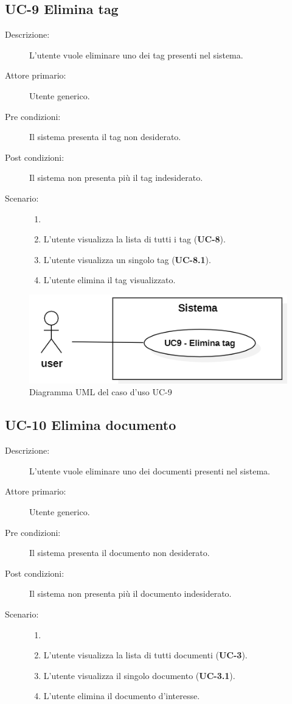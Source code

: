\subsection{UC-9 Elimina tag}
\begin{description}
    \item[Descrizione:] L'utente vuole eliminare uno dei tag presenti nel sistema.
    \item[Attore primario:] Utente generico.
    \item[Pre condizioni:] Il sistema presenta il tag non desiderato.
    \item[Post condizioni:] Il sistema non presenta più il tag indesiderato.
    \item[Scenario:]
    \begin{enumerate}
        \item[]
        \item L’utente visualizza la lista di tutti i tag (\textbf{UC-8}).
        \item L'utente visualizza un singolo tag (\textbf{UC-8.1}).
        \item L'utente elimina il tag visualizzato.
    \end{enumerate}
\end{description}

\begin{figure}[H]
    \centering
    \includegraphics[width=0.8\linewidth]{UC9.PNG} 
    \caption{Diagramma UML del caso d'uso UC-9}
    \label{fig:UC9}
\end{figure}

\subsection{UC-10 Elimina documento}
\begin{description}
    \item[Descrizione:] L'utente vuole eliminare uno dei documenti presenti nel sistema.
    \item[Attore primario:] Utente generico.
    \item[Pre condizioni:] Il sistema presenta il documento non desiderato.
    \item[Post condizioni:] Il sistema non presenta più il documento indesiderato.
    \item[Scenario:]
    \begin{enumerate}
        \item[]
        \item L’utente visualizza la lista di tutti documenti (\textbf{UC-3}).
        \item L'utente visualizza il singolo documento (\textbf{UC-3.1}).
        \item L'utente elimina il documento d'interesse.
    \end{enumerate} 
\end{description}

